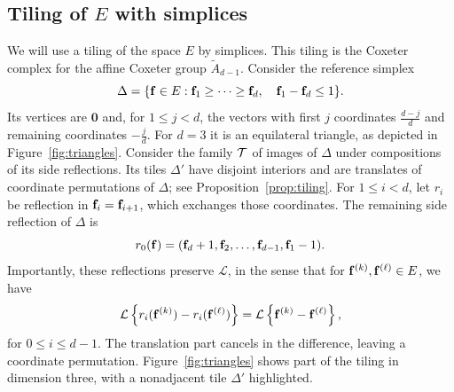 \documentclass[11pt,letterpaper]{article}
\begin{document}
\subsection{Tiling of \texorpdfstring{$E$}{E} with simplices}\label{sec:tiling}
We will use a tiling of the space $E$ by simplices. This tiling is the Coxeter complex for the affine Coxeter group $\widetilde{A}_{d-1}$. Consider the reference simplex
\[
      \Delta=\{\mathbf f\in E:\mathbf f_1\ge\cdots\ge\mathbf f_d,\quad \mathbf f_1-\mathbf f_d\le1\}.
\]
Its vertices are $\mathbf0$ and, for $1\le j<d$, the vectors with first $j$ coordinates $\frac{d-j}{d}$ and remaining coordinates $-\frac jd$. For $d=3$ it is an equilateral triangle, as depicted in Figure~\ref{fig:triangles}.
Consider the family $\mathcal T$ of images of $\Delta$ under compositions of its side reflections. Its tiles $\Delta'$ have disjoint interiors and are translates of coordinate permutations of $\Delta$; see Proposition~\ref{prop:tiling}.
For $1\le i<d$, let $r_i$ be reflection in $\mathbf f_i=\mathbf f_{i+1}$, which exchanges those coordinates. The remaining side reflection of $\Delta$ is
\[
      r_0(\mathbf f)=(\mathbf f_d+1,\mathbf f_2,\ldots,\mathbf f_{d-1},\mathbf f_1-1).
\]
Importantly, these reflections preserve $\mathcal L$, in the sense that for $\mathbf f^{(k)},\mathbf f^{(\ell)}\in E$, we have
\[\mathcal L\left\{r_{i}(\mathbf f^{(k)})-r_{i}(\mathbf f^{(\ell)})\right\}=\mathcal L\left\{\mathbf f^{(k)}-\mathbf f^{(\ell)}\right\},\]
for $0\leq i\leq d-1$. The translation part cancels in the difference, leaving a coordinate permutation. Figure~\ref{fig:triangles} shows part of the tiling in dimension three, with a nonadjacent tile $\Delta'$ highlighted.
\end{document}
